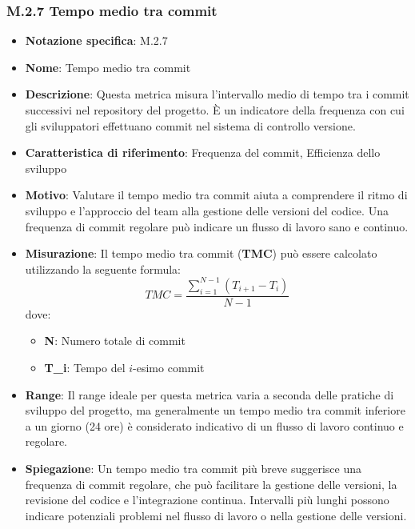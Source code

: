 \subsubsection{M.2.7 Tempo medio tra commit}
\begin{itemize}
    \item \textbf{Notazione specifica}: M.2.7
    \item \textbf{Nome}: Tempo medio tra commit
    \item \textbf{Descrizione}: Questa metrica misura l'intervallo medio di tempo tra i commit successivi nel repository del progetto. È un indicatore della frequenza con cui gli sviluppatori effettuano commit nel sistema di controllo versione.
    \item \textbf{Caratteristica di riferimento}: Frequenza del commit, Efficienza dello sviluppo
    \item \textbf{Motivo}: Valutare il tempo medio tra commit aiuta a comprendere il ritmo di sviluppo e l'approccio del team alla gestione delle versioni del codice. Una frequenza di commit regolare può indicare un flusso di lavoro sano e continuo.
    \item \textbf{Misurazione}: Il tempo medio tra commit (\textbf{TMC}) può essere calcolato utilizzando la seguente formula:
    \[ TMC = \frac{\sum_{i=1}^{N-1} (T_{i+1} - T_i)}{N-1} \]
    dove:
    \begin{itemize}
        \item \textbf{N}: Numero totale di commit
        \item \textbf{T_i}: Tempo del \(i\)-esimo commit
    \end{itemize}
    \item \textbf{Range}: Il range ideale per questa metrica varia a seconda delle pratiche di sviluppo del progetto, ma generalmente un tempo medio tra commit inferiore a un giorno (24 ore) è considerato indicativo di un flusso di lavoro continuo e regolare.
    \item \textbf{Spiegazione}: Un tempo medio tra commit più breve suggerisce una frequenza di commit regolare, che può facilitare la gestione delle versioni, la revisione del codice e l'integrazione continua. Intervalli più lunghi possono indicare potenziali problemi nel flusso di lavoro o nella gestione delle versioni.
\end{itemize}
